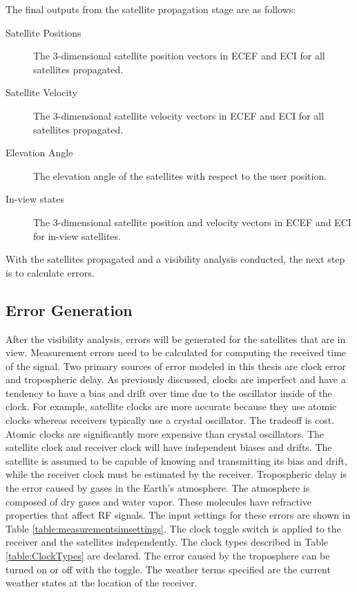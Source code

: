 \documentclass[12pt]{report}
\begin{document}
The final outputs from the satellite propagation stage are as follows:
\begin{description}
    \item[Satellite Positions] The 3-dimensional satellite position vectors in ECEF and ECI for all satellites propagated.
    \item[Satellite Velocity] The 3-dimensional satellite velocity vectors in ECEF and ECI for all satellites propagated.
    \item[Elevation Angle] The elevation angle of the satellites with respect to the user position.
    \item[In-view states] The 3-dimensional satellite position and velocity vectors in ECEF and ECI for in-view satellites.
\end{description}

With the satellites propagated and a visibility analysis conducted, the next step is to calculate errors.

\subsection{Error Generation}

After the visibility analysis, errors will be generated for the satellites that are in view. Measurement errors need to be calculated for computing the received time of the signal. Two primary sources of error modeled in this thesis are clock error and tropospheric delay. As previously discussed, clocks are imperfect and have a tendency to have a bias and drift over time due to the oscillator inside of the clock. For example, satellite clocks are more accurate because they use atomic clocks whereas receivers typically use a crystal oscillator. The tradeoff is cost. Atomic clocks are significantly more expensive than crystal oscillators. The satellite clock and receiver clock will have independent biases and drifts. The satellite is assumed to be capable of knowing and transmitting its bias and drift, while the receiver clock must be estimated by the receiver. Tropospheric delay is the error caused by gases in the Earth's atmosphere. The atmosphere is composed of dry gases and water vapor. These molecules have refractive properties that affect RF signals. The input settings for these errors are shown in Table \ref{table:measurementsimsettings}. The clock toggle switch is applied to the receiver and the satellites independently. The clock types described in Table \ref{table:ClockTypes} are declared. The error caused by the troposphere can be turned on or off with the toggle. The weather terms specified are the current weather states at the location of the receiver. 
\end{document}
